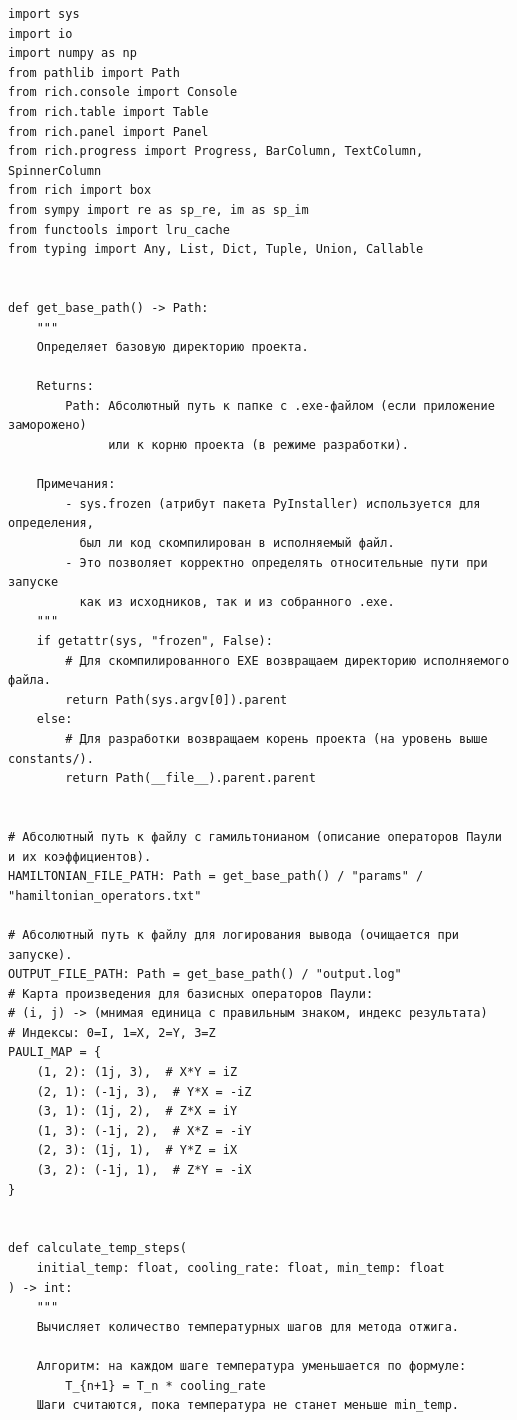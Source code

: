 \documentclass[a4paper]{report}
\begin{document}
\begin{lstlisting}
import sys
import io
import numpy as np
from pathlib import Path
from rich.console import Console
from rich.table import Table
from rich.panel import Panel
from rich.progress import Progress, BarColumn, TextColumn, SpinnerColumn
from rich import box
from sympy import re as sp_re, im as sp_im
from functools import lru_cache
from typing import Any, List, Dict, Tuple, Union, Callable


def get_base_path() -> Path:
    """
    Определяет базовую директорию проекта.

    Returns:
        Path: Абсолютный путь к папке с .exe-файлом (если приложение заморожено)
              или к корню проекта (в режиме разработки).

    Примечания:
        - sys.frozen (атрибут пакета PyInstaller) используется для определения,
          был ли код скомпилирован в исполняемый файл.
        - Это позволяет корректно определять относительные пути при запуске
          как из исходников, так и из собранного .exe.
    """
    if getattr(sys, "frozen", False):
        # Для скомпилированного EXE возвращаем директорию исполняемого файла.
        return Path(sys.argv[0]).parent
    else:
        # Для разработки возвращаем корень проекта (на уровень выше constants/).
        return Path(__file__).parent.parent


# Абсолютный путь к файлу с гамильтонианом (описание операторов Паули и их коэффициентов).
HAMILTONIAN_FILE_PATH: Path = get_base_path() / "params" / "hamiltonian_operators.txt"

# Абсолютный путь к файлу для логирования вывода (очищается при запуске).
OUTPUT_FILE_PATH: Path = get_base_path() / "output.log"
# Карта произведения для базисных операторов Паули:
# (i, j) -> (мнимая единица с правильным знаком, индекс результата)
# Индексы: 0=I, 1=X, 2=Y, 3=Z
PAULI_MAP = {
    (1, 2): (1j, 3),  # X*Y = iZ
    (2, 1): (-1j, 3),  # Y*X = -iZ
    (3, 1): (1j, 2),  # Z*X = iY
    (1, 3): (-1j, 2),  # X*Z = -iY
    (2, 3): (1j, 1),  # Y*Z = iX
    (3, 2): (-1j, 1),  # Z*Y = -iX
}


def calculate_temp_steps(
    initial_temp: float, cooling_rate: float, min_temp: float
) -> int:
    """
    Вычисляет количество температурных шагов для метода отжига.

    Алгоритм: на каждом шаге температура уменьшается по формуле:
        T_{n+1} = T_n * cooling_rate
    Шаги считаются, пока температура не станет меньше min_temp.


\end{lstlisting}
\end{document}
